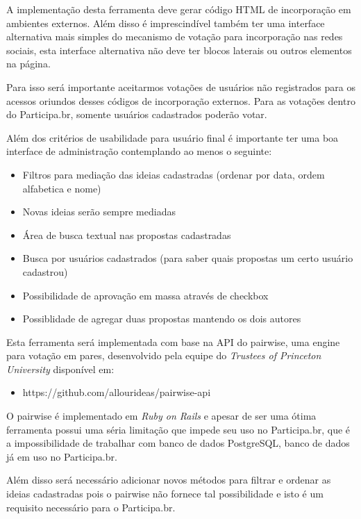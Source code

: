 \documentclass[12pt]{article}
\begin{document}
A implementação desta ferramenta deve gerar código HTML de incorporação em
ambientes externos. Além disso é imprescindível também ter uma interface
alternativa mais simples do mecanismo de votação para incorporação nas redes
sociais, esta interface alternativa não deve ter blocos laterais ou outros
elementos na página.

Para isso será importante aceitarmos votações de usuários não registrados para
os acessos oriundos desses códigos de incorporação externos. Para as votações
dentro do Participa.br, somente usuários cadastrados poderão votar.

Além dos critérios de usabilidade para usuário final é importante ter uma boa
interface de administração contemplando ao menos o seguinte:

\begin{itemize}
  \item Filtros para mediação das ideias cadastradas (ordenar por data, ordem
    alfabetica e nome)
  \item Novas ideias serão sempre mediadas
  \item Área de busca textual nas propostas cadastradas
  \item Busca por usuários cadastrados (para saber quais propostas
    um certo usuário cadastrou)
  \item Possibilidade de aprovação em massa através de checkbox
  \item Possiblidade de agregar duas propostas mantendo os dois autores
\end{itemize}

Esta ferramenta será implementada com base na API do pairwise, uma
engine para votação em pares, desenvolvido pela equipe do {\it Trustees of
Princeton University} disponível em:

\begin{itemize}
  \item https://github.com/allourideas/pairwise-api
\end{itemize}

O pairwise é implementado em {\it Ruby on
Rails}\cite{wikipediaRails} e apesar de ser uma ótima ferramenta
possui uma séria limitação que impede seu uso no Participa.br, que é a
impossibilidade de trabalhar com banco de dados PostgreSQL, banco de dados já
em uso no Participa.br.

Além disso será necessário adicionar novos métodos para filtrar e ordenar as
ideias cadastradas pois o pairwise não fornece tal possibilidade e isto é um
requisito necessário para o Participa.br.
\end{document}
